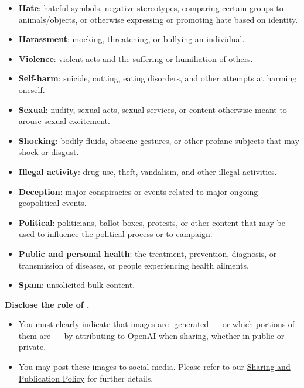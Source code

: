 \begin{itemize}
\item \textbf{Hate}: hateful symbols, negative stereotypes, comparing certain
    groups to animals/objects, or otherwise expressing or promoting hate based
    on identity.
\item \textbf{Harassment}: mocking, threatening, or bullying an individual.
\item \textbf{Violence}: violent acts and the suffering or humiliation of
    others.
\item \textbf{Self-harm}: suicide, cutting, eating disorders, and other attempts
    at harming oneself.
\item \textbf{Sexual}: nudity, sexual acts, sexual services, or content
    otherwise meant to arouse sexual excitement.
\item \textbf{Shocking}: bodily fluids, obscene gestures, or other profane
    subjects that may shock or disgust.
\item \textbf{Illegal activity}: drug use, theft, vandalism, and other illegal
    activities.
\item \textbf{Deception}: major conspiracies or events related to major ongoing
    geopolitical events.
\item \textbf{Political}: politicians, ballot-boxes, protests, or other content
    that may be used to influence the political process or to campaign.
\item \textbf{Public and personal health}: the treatment, prevention, diagnosis,
    or transmission of diseases, or people experiencing health ailments.
\item \textbf{Spam}: unsolicited bulk content.
\end{itemize}


\vspace{.5em}\noindent\textbf{Disclose the role of \AI.}

\begin{itemize}
\item You must clearly indicate that images are \AI-generated --- or which
    portions of them are --- by attributing to OpenAI when sharing, whether in
    public or private.
\item You may post these images to social media. Please refer to our
    \href{https://web.archive.org/web/20220803232350/https://openai.com/api/policies/sharing-publication/}{Sharing
    and Publication Policy} for further details.
\end{itemize}


